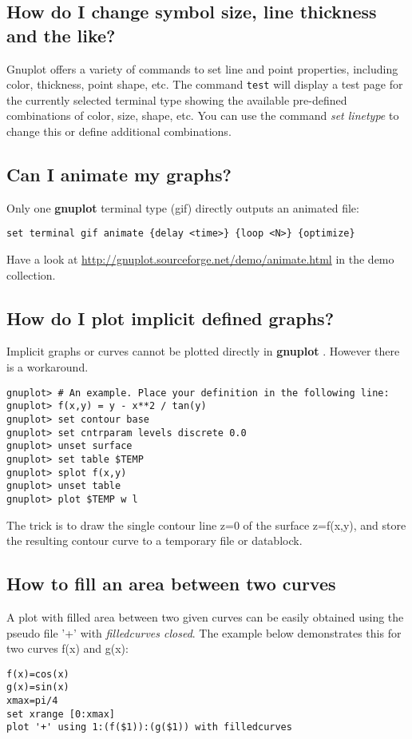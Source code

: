 \documentclass[a4paper,11pt]{article}
\def\http#1{{\small\href{http://#1}{\url{http://#1}}}}
\newcommand{\http}[1]%
            {\htmladdnormallink{\latex{\url{http://#1}}%
                    \html{\textit{http://#1}}}%
                {http://#1}%
            }
\newcommand{\gnuplot}{\textbf{gnuplot }}
\begin{document}
\subsection{How do I change symbol size, line thickness and the like?}

Gnuplot offers a variety of commands to set line and point properties,
including color, thickness, point shape, etc.  The command \verb+test+ will
display a test page for the currently selected terminal type showing
the available pre-defined combinations of color, size, shape, etc.
You can use the command \textit{set linetype} to change this or 
define additional combinations.


\subsection{Can I animate my graphs?}

Only one \gnuplot terminal type (gif) directly outputs an animated file:
\begin{verbatim}
set terminal gif animate {delay <time>} {loop <N>} {optimize}
\end{verbatim}

Have a look at
\http{gnuplot.sourceforge.net/demo/animate.html}
in the demo collection.


\subsection{How do I plot implicit defined graphs?}

Implicit graphs or curves cannot be plotted directly in \gnuplot.
However there is a workaround. 
\small
\begin{verbatim}
gnuplot> # An example. Place your definition in the following line:
gnuplot> f(x,y) = y - x**2 / tan(y)
gnuplot> set contour base
gnuplot> set cntrparam levels discrete 0.0
gnuplot> unset surface
gnuplot> set table $TEMP
gnuplot> splot f(x,y)
gnuplot> unset table
gnuplot> plot $TEMP w l
\end{verbatim}
\normalsize
The trick is to draw the single contour line z=0 of the surface
z=f(x,y), and store the resulting contour curve to a temporary file or datablock.
 

\subsection{How to fill an area between two curves}

A plot with filled area between two given curves can be easily obtained using
the pseudo file '+' with \textit{filledcurves closed}. The example below
demonstrates this for two curves f(x) and g(x):
\small
\begin{verbatim}
f(x)=cos(x)
g(x)=sin(x)
xmax=pi/4
set xrange [0:xmax]
plot '+' using 1:(f($1)):(g($1)) with filledcurves
\end{verbatim}
\normalsize
\end{document}
